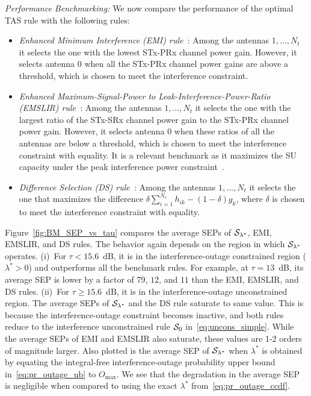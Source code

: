 \documentclass[12pt,draftcls,peerreview,onecolumn]{IEEEtran}
\newcommand{\lam}{\lambda}
\newcommand{\lamstar}{\lam^{*}}
\newcommand{\Nt}{{N_t}}
\newcommand{\Nr}{{N_r}}
\newcommand{\such}{h}
\newcommand{\puch}{g}
\newcommand{\hk}[1]{{\such_{#1}}}
\newcommand{\gk}[1]{{\puch_{#1}}}
\newcommand{\outmax}{O_{\text{max}}}
\newcommand{\itau}{\tau}
\newcommand{\caluncons}{{\cal S_{\text{0}}}}
\newcommand{\callamstarrule}{\cal S_{\lam^{*}}}
\newcommand{\sumnr}{\sum_{i=1}^{\Nr}}
\begin{document}
{\em Performance Benchmarking:} We now compare the performance of the optimal TAS rule with the following rules:
\begin{itemize}
\item {\em Enhanced Minimum Interference (EMI) rule~\cite{Sarvendranath_2013_TCOM}}: Among the antennas $1,\ldots,\Nt$ it selects the one with the lowest STx-PRx channel power gain. However, it selects antenna $0$ when all the STx-PRx channel power gains are above a threshold, which is chosen to meet the interference constraint. 

\item {\em Enhanced Maximum-Signal-Power to Leak-Interference-Power-Ratio (EMSLIR) rule~\cite{Sarvendranath_2013_TCOM}}: Among the antennas $1,\ldots,\Nt$ it selects the one with the largest ratio of the STx-SRx channel power gain to the STx-PRx channel power gain. However, it selects antenna $0$ when these ratios of all the antennas are below a threshold, which is chosen to meet the interference constraint with equality. It is a relevant benchmark as it maximizes the SU capacity under the peak interference power constraint~\cite{Wang_2010_TWC}. 

\item {\em Difference Selection (DS) rule~\cite{Wang_2011_TCom,Sarvendranath_2014_TCOM}}: Among the antennas $1,\ldots,\Nt$ it selects the one that maximizes the difference $\delta \sumnr\hk{ik} -(1-\delta) \gk{k} $, where $\delta$ is chosen to meet the interference constraint with equality.   

\end{itemize}
Figure~\ref{fig:BM_SEP_vs_tau} compares the average SEPs of $\callamstarrule$, EMI, EMSLIR, and DS rules. The behavior again depends on the region in which $\callamstarrule$ operates. (i)~For $\itau < 15.6$~dB, it is in the interference-outage constrained region ($\lamstar>0$) and outperforms all the benchmark rules. For example, at $\itau=13$~dB,  its average SEP is lower by a factor of $79$, $12$, and $11$ than the EMI, EMSLIR, and DS rules. (ii)~For $\itau \geq 15.6$~dB, it is in the interference-outage unconstrained region. The average SEPs of $\callamstarrule$ and the DS rule saturate to same value. This is because the interference-outage constraint becomes inactive, and both rules reduce to the interference unconstrained rule $\caluncons$ in~\eqref{eq:uncons_simple}. While the average SEPs of EMI and EMSLIR also saturate, these values are 1-2 orders of magnitude larger. Also plotted is the average SEP of $\callamstarrule$ when $\lamstar$ is obtained by equating the integral-free interference-outage probability upper bound in~\eqref{eq:pr_outage_ub} to $\outmax$. We see that the degradation in the average SEP  is negligible when compared to using the exact $\lamstar$ from~\eqref{eq:pr_outage_ccdf}. 
\end{document}
